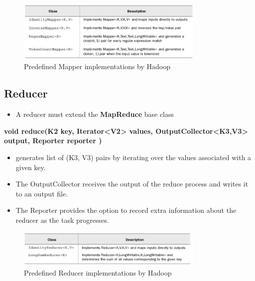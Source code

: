 \documentclass{article}
\begin{document}
\begin{multicols}{2}
\begin{figure}[H]
\centering
\includegraphics[width=9cm]{assets/mapper_functions.png}
\caption{Predefined Mapper implementations by Hadoop}
\label{fig:awesome_image}
\end{figure}


\subsection {Reducer}
\begin{itemize}
\item A reducer must extend the \textbf{MapReduce} base class
\end{itemize}
\textbf{void reduce(K2 key, Iterator<V2> values, OutputCollector<K3,V3> output, Reporter reporter ) }
\begin{itemize}
\item generates list of (K3, V3) pairs by iterating over the values associated with a given key. 
\item The OutputCollector receives the output of the reduce process and writes it to an output file. 
\item The Reporter provides the option to record extra information about the reducer as the task progresses.
\end{itemize}
\begin{figure}[H]
\centering
\includegraphics[width=9cm]{assets/reducer_impl.png}
\caption{Predefined Reducer implementations by Hadoop}
\label{fig:awesome_image}
\end{figure}


\end{multicols}
\end{document}
